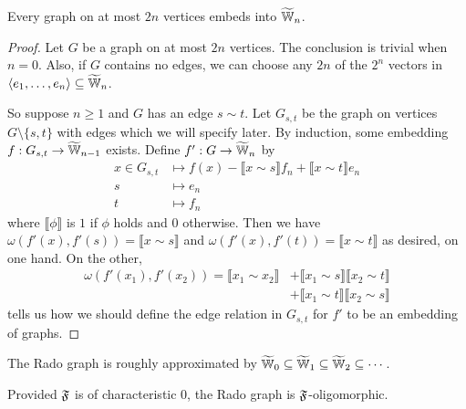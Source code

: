 \begin{proposition}[{\cite[Theorem~8.11.2]{GR01}}]
    Every graph on at most $2n$ vertices embeds into $\widetilde {\mathbb{W}}_n$.
\end{proposition}
\begin{proof}
    Let $G$ be a graph on at most $2n$ vertices. 
    The conclusion is trivial when $n = 0$.
    Also, if $G$ contains no edges, we can choose any $2n$ of the $2^n$ vectors in 
    $\langle e_1, \ldots, e_n \rangle \subseteq \widetilde {\mathbb{W}}_n$.
    
    So suppose $n \geq 1$ and $G$ has an edge $s \sim t$.
    Let $G_{s,t}$ be the graph on vertices $G \setminus \{s, t\}$ with edges which we will specify later.
    By induction, some embedding $f : G_{s, t} \to \widetilde {\mathbb{W}}_{n-1}$ exists.
    Define $f' : G \to \widetilde {\mathbb{W}}_n$ by
    \begin{align*}
        x \in G_{s, t} &\mapsto f(x) - \llbracket x \sim s \rrbracket f_n + \llbracket x \sim t \rrbracket e_n \\
        s &\mapsto e_n \\
        t &\mapsto f_n
    \end{align*}
    where $\llbracket \phi \rrbracket$ is $1$ if $\phi$ holds and $0$ otherwise.
    Then we have $\omega(f'(x), f'(s)) = \llbracket x \sim s \rrbracket$ 
    and $\omega(f'(x), f'(t)) = \llbracket x \sim t \rrbracket$ as desired, on one hand.
    On the other,
    \begin{align*}
        \omega( f'(x_1), f'(x_2) ) 
        = \llbracket x_1 \sim x_2 \rrbracket 
        &+ \llbracket x_1 \sim s \rrbracket \llbracket x_2 \sim t \rrbracket \\
        &+ \llbracket x_1 \sim t \rrbracket \llbracket x_2 \sim s \rrbracket
    \end{align*}
    tells us how we should define the edge relation in $G_{s,t}$ for $f'$ to be an embedding of graphs.
\end{proof}

\begin{theorem}
    The Rado graph is roughly approximated by $\widetilde {\mathbb{W}}_0 \subseteq \widetilde {\mathbb{W}}_1 \subseteq \widetilde {\mathbb{W}}_2 \subseteq \cdots$.
\end{theorem}

\begin{corollary}
    Provided $\mathfrak{F}$ is of characteristic $0$, the Rado graph is $\mathfrak{F}$-oligomorphic.
\end{corollary}

